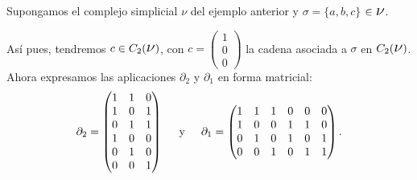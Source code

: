 \documentclass[12pt, a4paper, twoside]{book}
\numberwithin{equation}{section}
\theoremstyle{definition}
\newenvironment{ejem}
  {\pushQED{\qed}\renewcommand{\qedsymbol}{$\blacktriangleleft$}\ejemplo}
  {\popQED\endejemplo}
\theoremstyle{remark}
\theoremstyle{plain}
\begin{document}
	\begin{ejem}
		Supongamos el complejo simplicial {\Large $\nu$} del ejemplo 
		anterior y $\sigma = \{a,b,c\}$ $\in \text{{\Large $\nu$}}$.

		Así pues, tendremos $c \in C_{2}(\text{{\Large $\nu$}})$, con
		$c=\begin{pmatrix}
			1 \\
			0 \\
			0 
		\end{pmatrix}$ la cadena asociada a $\sigma$ en $C_{2}(
		\text{{\Large $\nu$}})$. Ahora expresamos las aplicaciones 
		$\partial_{2}$ y $\partial_{1}$ en forma matricial:
		\begin{equation*}
			\partial_{2}= \begin{pmatrix}
				1 & 1 & 0 \\
				1 & 0 & 1 \\
				0 & 1 & 1 \\
				1 & 0 & 0 \\
				0 & 1 & 0 \\
				0 & 0 & 1
			\end{pmatrix}
			\hspace{0.5cm}\text{y}\hspace{0.5cm}
			\partial_{1}= \begin{pmatrix}
				1 & 1 & 1 & 0 & 0 &0 \\
				1 & 0 & 0 & 1 & 1 &0 \\
				0 & 1 & 0 & 1 & 0 &1 \\
				0 & 0 & 1 & 0 & 1 &1
			\end{pmatrix}.
		\end{equation*}


\end{ejem}
\end{document}
